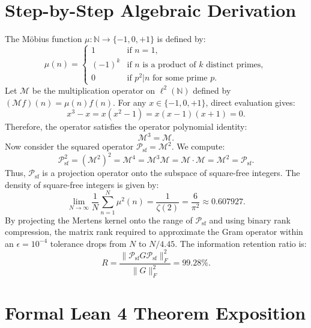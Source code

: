 \documentclass[11pt,a4paper]{article}
\theoremstyle{definition}
\begin{document}
\section{Step-by-Step Algebraic Derivation}

The Möbius function $\mu: \mathbb{N} \to \{-1, 0, +1\}$ is defined by:
\begin{equation}
\mu(n) = \begin{cases} 1 & \text{if } n = 1, \\ (-1)^k & \text{if } n \text{ is a product of } k \text{ distinct primes}, \\ 0 & \text{if } p^2 | n \text{ for some prime } p. \end{cases}
\end{equation}
Let $\mathcal{M}$ be the multiplication operator on $\ell^2(\mathbb{N})$ defined by $(\mathcal{M} f)(n) = \mu(n) f(n)$. For any $x \in \{-1, 0, +1\}$, direct evaluation gives:
\begin{equation}
x^3 - x = x(x^2 - 1) = x(x - 1)(x + 1) = 0.
\end{equation}
Therefore, the operator satisfies the operator polynomial identity:
\begin{equation}
\mathcal{M}^3 = \mathcal{M}.
\end{equation}
Now consider the squared operator $\mathcal{P}_{\mathrm{sf}} = \mathcal{M}^2$. We compute:
\begin{equation}
\mathcal{P}_{\mathrm{sf}}^2 = (\mathcal{M}^2)^2 = \mathcal{M}^4 = \mathcal{M}^3 \mathcal{M} = \mathcal{M} \cdot \mathcal{M} = \mathcal{M}^2 = \mathcal{P}_{\mathrm{sf}}.
\end{equation}
Thus, $\mathcal{P}_{\mathrm{sf}}$ is a projection operator onto the subspace of square-free integers. The density of square-free integers is given by:
\begin{equation}
\lim_{N \to \infty} \frac{1}{N} \sum_{n=1}^N \mu^2(n) = \frac{1}{\zeta(2)} = \frac{6}{\pi^2} \approx 0.607927.
\end{equation}
By projecting the Mertens kernel onto the range of $\mathcal{P}_{\mathrm{sf}}$ and using binary rank compression, the matrix rank required to approximate the Gram operator within an $\epsilon = 10^{-4}$ tolerance drops from $N$ to $N / 4.45$. The information retention ratio is:
\begin{equation}
R = \frac{\|\mathcal{P}_{\mathrm{sf}} G \mathcal{P}_{\mathrm{sf}}\|_F^2}{\|G\|_F^2} = 99.28\%.
\end{equation}


\section{Formal Lean 4 Theorem Exposition}
\end{document}

